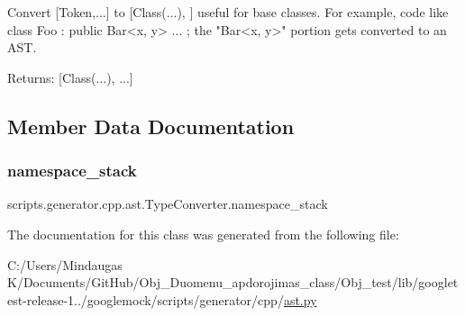 \begin{DoxyVerb}Convert [Token,...] to [Class(...), ] useful for base classes.
For example, code like class Foo : public Bar<x, y> { ... };
the "Bar<x, y>" portion gets converted to an AST.

Returns:
  [Class(...), ...]
\end{DoxyVerb}
 

\subsection{Member Data Documentation}
\mbox{\label{classscripts_1_1generator_1_1cpp_1_1ast_1_1_type_converter_a4d4cfee01c25ca73fb68ae5d7d3ca7a2}} 
\subsubsection{\texorpdfstring{namespace\_stack}{namespace\_stack}}
{\footnotesize\ttfamily scripts.\+generator.\+cpp.\+ast.\+Type\+Converter.\+namespace\+\_\+stack}



The documentation for this class was generated from the following file\+:\begin{DoxyCompactItemize}
\item 
C\+:/\+Users/\+Mindaugas K/\+Documents/\+Git\+Hub/\+Obj\+\_\+\+Duomenu\+\_\+apdorojimas\+\_\+class/\+Obj\+\_\+test/lib/googletest-\/release-\/1../googlemock/scripts/generator/cpp/\mbox{\hyperlink{_obj__test_2lib_2googletest-release-1_88_81_2googlemock_2scripts_2generator_2cpp_2ast_8py}{ast.\+py}}\end{DoxyCompactItemize}

